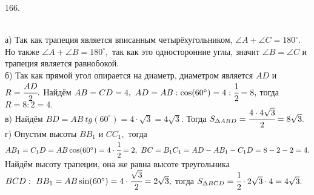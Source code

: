 166. \begin{figure}[ht!]
\end{figure}\\
а) Так как трапеция является вписанным четырёхугольником, $\angle A+\angle C=180^\circ.$ Но также $\angle A +\angle B=180^\circ,$ так как это односторонние углы, значит $\angle B=\angle C$ и трапеция является равнобокой.\\
б) Так как прямой угол опирается на диаметр, диаметром является $AD$ и $R=\cfrac{AD}{2}.$ Найдём $AB=CD=4,\ AD=AB:\cos(60^\circ)=4:\cfrac{1}{2}=8,$ тогда $R=8:2=4.$\\
в) Найдём $BD=AB\ tg(60^\circ)=4\cdot \sqrt{3}=4\sqrt{3}.$ Тогда $S_{\Delta ABD}=\cfrac{4\cdot4\sqrt{3}}{2}=8\sqrt{3}.$\\
г) Опустим высоты $BB_1$ и $CC_1,$ тогда $AB_1=C_1D=AB\cos(60^\circ)=4\cdot\cfrac{1}{2}=2,\ BC=B_1C_1=AD-AB_1-C_1D=8-2-2=4.$ Найдём высоту трапеции, она же равна высоте треугольника $BCD:\ BB_1=AB\sin(60^\circ)=4\cdot\cfrac{\sqrt{3}}{2}=2\sqrt{3},$ тогда $S_{\Delta BCD}=\cfrac{1}{2}\cdot2\sqrt{3}\cdot4=4\sqrt{3}.$\\
